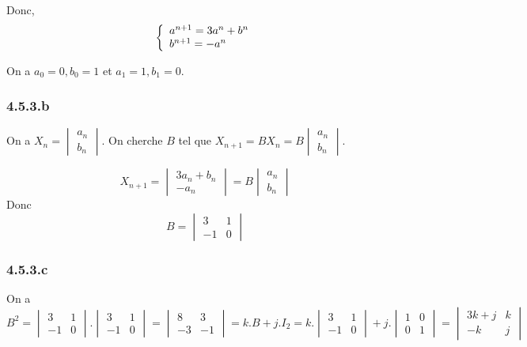 \documentclass[]{book}
\theoremstyle{definition}
\begin{document}
Donc,
$$
\left\{ 
\begin{array}{l l}
a^{n+1} = 3a^{n} + b^{n}\\
b^{n+1} = -a^{n} \\
\end{array}
\right. 
$$
 
On a $a_0=0, b_0=1$ et $a_1=1, b_1=0$.

\subsubsection*{4.5.3.b}
On a $X_n = \begin{vmatrix} a_n \\ b_n \end{vmatrix}$. On cherche $B$ tel que $X_{n+1} = B X_n = B\begin{vmatrix} a_{n} \\ b_{n} \end{vmatrix}$.

$$X_{n+1} = \begin{vmatrix} 3a_n + b_n\\ -a_{n} \end{vmatrix} = B\begin{vmatrix} a_{n} \\ b_{n} \end{vmatrix}$$
Donc
$$B = \begin{vmatrix} 3 & 1 \\ -1 & 0 \end{vmatrix}$$


\subsubsection*{4.5.3.c}

On a 
$$B^2 = \begin{vmatrix} 3 & 1 \\ -1 & 0 \end{vmatrix} . \begin{vmatrix} 3 & 1 \\ -1 & 0 \end{vmatrix} =
\begin{vmatrix} 8 & 3 \\ -3 & -1 \end{vmatrix} = k.B + j.I_2 =
k . \begin{vmatrix} 3 & 1 \\ -1 & 0 \end{vmatrix} + j .\begin{vmatrix} 1 & 0 \\ 0 & 1 \end{vmatrix} = 
\begin{vmatrix} 3k+j & k \\ -k & j \end{vmatrix} 
$$
\end{document}

